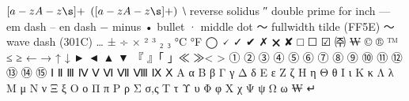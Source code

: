 \([a-zA-z\s]+\) \(([a-zA-z\s]+)\)
⧵ reverse solidus ″  double prime for inch — em dash – en dash − minus
• bullet · middle dot ～ fullwidth tilde (FF5E) 〜 wave dash (301C) … 
± ÷ × ² ³ ₂ ₃
°C °F ◯ 🗸 ✓ ✔ ✗ 🗙 ✘ □ ☐ ☑ 
㈜ ₩ © ® ™
≤ ≥ ← → ↑ ↓ ► ◄ ▲ ▼
『 』「 」≪ ≫< >
① ② ③ ④ ⑤ ⑥ ⑦ ⑧ ⑨ ⑩ ⑪ ⑫ ⑬ ⑭ ⑮
Ⅰ Ⅱ Ⅲ Ⅳ Ⅴ Ⅵ Ⅶ Ⅷ Ⅸ Ⅹ
Α	α	Β	β	Γ	γ	Δ	δ	Ε	ε	Ζ	ζ	Η	η	Θ	θ	Ι	ι	Κ	κ	Λ	λ	Μ	μ	
Ν	ν	Ξ	ξ	Ο	ο	Π	π	Ρ	ρ	Σ	σ,ς Τ	τ	Υ	υ	Φ	φ	Χ	χ	Ψ	ψ	Ω	ω
₩ 
↵